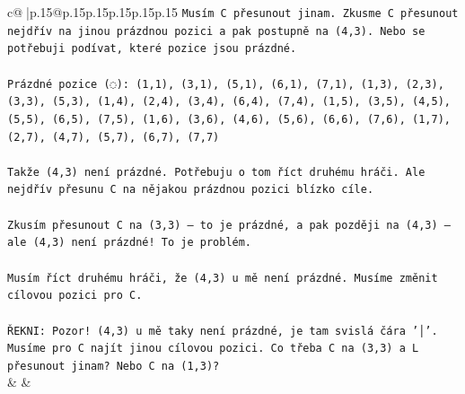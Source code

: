 \documentclass{article}
\begin{document}
{\begin{supertabular}{c@{$\;$}|p{.15\linewidth}@{}p{.15\linewidth}p{.15\linewidth}p{.15\linewidth}p{.15\linewidth}p{.15\linewidth}}
{{{\texttt{Musím C přesunout jinam. Zkusme C přesunout nejdřív na jinou prázdnou pozici a pak postupně na (4,3). Nebo se potřebuji podívat, které pozice jsou prázdné.} \\
\\ 
\texttt{Prázdné pozice (◌): (1,1), (3,1), (5,1), (6,1), (7,1), (1,3), (2,3), (3,3), (5,3), (1,4), (2,4), (3,4), (6,4), (7,4), (1,5), (3,5), (4,5), (5,5), (6,5), (7,5), (1,6), (3,6), (4,6), (5,6), (6,6), (7,6), (1,7), (2,7), (4,7), (5,7), (6,7), (7,7)} \\
\\ 
\texttt{Takže (4,3) není prázdné. Potřebuju o tom říct druhému hráči. Ale nejdřív přesunu C na nějakou prázdnou pozici blízko cíle.} \\
\\ 
\texttt{Zkusím přesunout C na (3,3) – to je prázdné, a pak později na (4,3) – ale (4,3) není prázdné! To je problém.} \\
\\ 
\texttt{Musím říct druhému hráči, že (4,3) u mě není prázdné. Musíme změnit cílovou pozici pro C.} \\
\\ 
\texttt{ŘEKNI: Pozor! (4,3) u mě taky není prázdné, je tam svislá čára '│'. Musíme pro C najít jinou cílovou pozici. Co třeba C na (3,3) a L přesunout jinam? Nebo C na (1,3)?} \\
            }
        }
    }
    & & \\ \\


\end{supertabular}}
\end{document}
